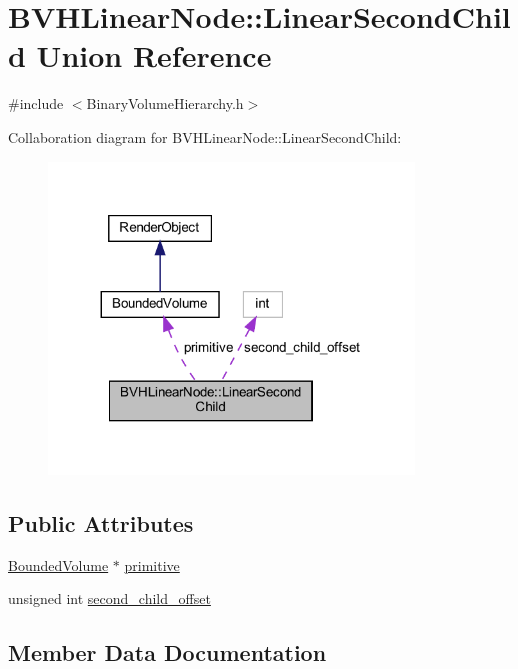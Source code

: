 \hypertarget{unionBVHLinearNode_1_1LinearSecondChild}{}\section{B\+V\+H\+Linear\+Node\+::Linear\+Second\+Child Union Reference}
\label{unionBVHLinearNode_1_1LinearSecondChild}


{\ttfamily \#include $<$Binary\+Volume\+Hierarchy.\+h$>$}



Collaboration diagram for B\+V\+H\+Linear\+Node\+::Linear\+Second\+Child\+:
\nopagebreak
\begin{figure}[H]
\begin{center}
\leavevmode
\includegraphics[width=275pt]{unionBVHLinearNode_1_1LinearSecondChild__coll__graph}
\end{center}
\end{figure}
\subsection*{Public Attributes}
\begin{DoxyCompactItemize}
\item 
\mbox{\hyperlink{classBoundedVolume}{Bounded\+Volume}} $\ast$ \mbox{\hyperlink{unionBVHLinearNode_1_1LinearSecondChild_ac8489c14e68bc1f8fee2cdf842199e61}{primitive}}
\item 
unsigned int \mbox{\hyperlink{unionBVHLinearNode_1_1LinearSecondChild_ac0a41d4aa3236a1f51741467112ee9ba}{second\+\_\+child\+\_\+offset}}
\end{DoxyCompactItemize}


\subsection{Member Data Documentation}
\mbox{\label{unionBVHLinearNode_1_1LinearSecondChild_ac8489c14e68bc1f8fee2cdf842199e61}} 
